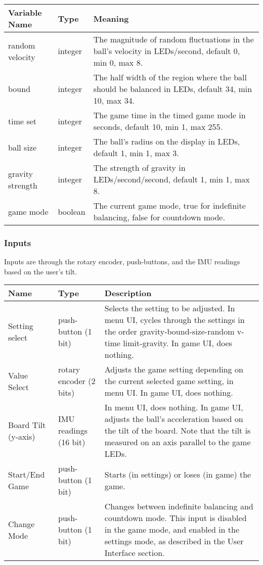 \documentclass[12pt]{article}
\begin{document}
\begin{center}
    \begin{tabularx}{\textwidth}{|l|l|X|}
        \hline Variable Name & Type & Meaning \\
        \hline random velocity & integer & The magnitude of random fluctuations in the ball's velocity in LEDs/second, default 0, min 0, max 8. \\
        \hline bound & integer & The half width of the region where the ball should be balanced in LEDs, default 34, min 10, max 34. \\
        \hline time set & integer & The game time in the timed game mode in seconds, default 10, min 1, max 255. \\
        \hline ball size & integer & The ball's radius on the display in LEDs, default 1, min 1, max 3. \\
        \hline gravity strength & integer & The strength of gravity in LEDs/second/second, default 1, min 1, max 8. \\
        \hline game mode & boolean & The current game mode, true for indefinite balancing, false for countdown mode.\\ \hline
    \end{tabularx}
\end{center}

\subsubsection*{Inputs}
Inputs are through the rotary encoder, push-buttons, and the IMU readings based on the user's tilt.
\begin{center}
\begin{tabularx}{\textwidth}{|l|l|X|}
    \hline Name & Type & Description \\
    \hline Setting select & push-button (1 bit) & Selects the setting to be adjusted. In menu UI, cycles through the settings in the order gravity-bound-size-random v-time limit-gravity. In game UI, does nothing.\\
    \hline Value Select & rotary encoder (2 bits) & Adjusts the game setting depending on the current selected game setting, in menu UI. In game UI, does nothing.\\
    \hline Board Tilt (y-axis) & IMU readings (16 bit) & In menu UI, does nothing. In game UI, adjusts the ball's acceleration based on the tilt of the board. Note that the tilt is measured on an axis parallel to the game LEDs.\\
    \hline Start/End Game & push-button (1 bit) & Starts (in settings) or loses (in game) the game. \\
    \hline Change Mode & push-button (1 bit) & Changes between indefinite balancing and countdown mode. This input is disabled in the game mode, and enabled in the settings mode, as described in the User Interface section. \\
    \hline
\end{tabularx}
\end{center}
\end{document}
